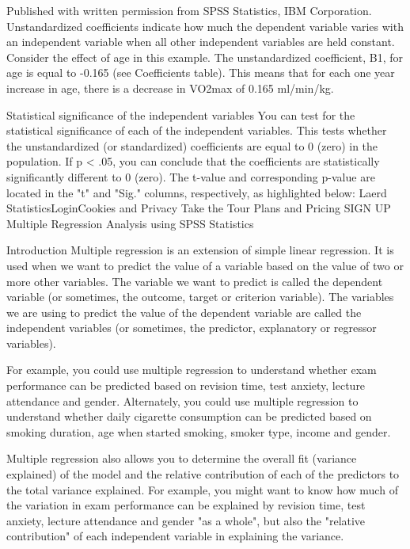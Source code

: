 \documentclass[]{article}
\begin{document}
	
	Published with written permission from SPSS Statistics, IBM Corporation.
	Unstandardized coefficients indicate how much the dependent variable varies with an independent variable when all other independent variables are held constant. Consider the effect of age in this example. The unstandardized coefficient, B1, for age is equal to -0.165 (see Coefficients table). This means that for each one year increase in age, there is a decrease in VO2max of 0.165 ml/min/kg.
	
	Statistical significance of the independent variables
	You can test for the statistical significance of each of the independent variables. This tests whether the unstandardized (or standardized) coefficients are equal to 0 (zero) in the population. If p < .05, you can conclude that the coefficients are statistically significantly different to 0 (zero). The t-value and corresponding p-value are located in the "t" and "Sig." columns, respectively, as highlighted below:
	Laerd StatisticsLoginCookies and Privacy
	Take the Tour Plans and Pricing SIGN UP
	Multiple Regression Analysis using SPSS Statistics
	
	Introduction
	Multiple regression is an extension of simple linear regression. It is used when we want to predict the value of a variable based on the value of two or more other variables. The variable we want to predict is called the dependent variable (or sometimes, the outcome, target or criterion variable). The variables we are using to predict the value of the dependent variable are called the independent variables (or sometimes, the predictor, explanatory or regressor variables).
	
	For example, you could use multiple regression to understand whether exam performance can be predicted based on revision time, test anxiety, lecture attendance and gender. Alternately, you could use multiple regression to understand whether daily cigarette consumption can be predicted based on smoking duration, age when started smoking, smoker type, income and gender.
	
	Multiple regression also allows you to determine the overall fit (variance explained) of the model and the relative contribution of each of the predictors to the total variance explained. For example, you might want to know how much of the variation in exam performance can be explained by revision time, test anxiety, lecture attendance and gender "as a whole", but also the "relative contribution" of each independent variable in explaining the variance.
	
\end{document}

